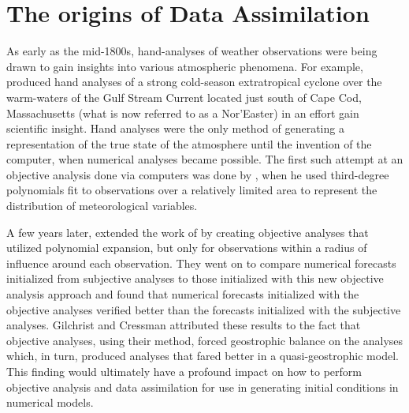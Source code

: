 

\section{The origins of Data Assimilation}
\label{The origins of Data Assimilation}

As early as the mid-1800s, hand-analyses of weather observations were being drawn to gain insights into various atmospheric phenomena. For example, \cite{redfield1841observations} produced hand analyses of a strong cold-season extratropical cyclone over the warm-waters of the Gulf Stream Current located just south of Cape Cod, Massachusetts (what is now referred to as a Nor'Easter) in an effort gain scientific insight. Hand analyses were the only method of generating a representation of the true state of the atmosphere until the invention of the computer, when numerical analyses became possible. The first such attempt at an objective analysis done via computers was done by \cite{panofsky1949oban}, when he used third-degree polynomials fit to observations over a relatively limited area to represent the distribution of meteorological variables.


A few years later, \cite{gilchrist1954oban} extended the work of \cite{panofsky1949oban} by creating objective analyses that utilized polynomial expansion, but only for observations within a radius of influence around each observation. They went on to compare numerical forecasts initialized from subjective analyses to those initialized with this new objective analysis approach and found that numerical forecasts initialized with the objective analyses verified better than the forecasts initialized with the subjective analyses. Gilchrist and Cressman attributed these results to the fact that objective analyses, using their method, forced geostrophic balance on the analyses which, in turn, produced analyses that fared better in a quasi-geostrophic model. This finding would ultimately have a profound impact on how to perform objective analysis and data assimilation for use in generating initial conditions in numerical models.


